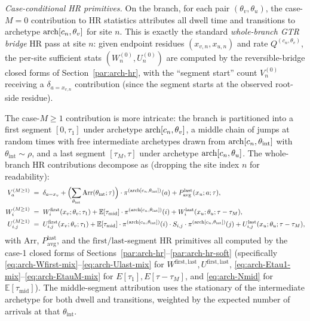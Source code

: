 \emph{Case-conditional HR primitives.} On the branch, for each pair
$(\theta_v, \theta_u)$, the case-$M{=}0$ contribution to HR statistics
attributes all dwell time and transitions to archetype $\mathrm{arch}[c_n,
\theta_v]$ for site $n$. This is exactly the standard \emph{whole-branch
GTR bridge} HR pass at site $n$: given endpoint residues $(x_{v, n},
x_{u, n})$ and rate $Q^{(c_n, \theta_v)}$, the per-site sufficient
stats $(W_n^{(0)}, U_n^{(0)})$ are computed by the reversible-bridge
closed forms of Section~\ref{par:arch-hr}, with the ``segment start''
count $V_n^{(0)}$ receiving a $\delta_{a = x_{v, n}}$ contribution
(since the segment starts at the observed root-side residue).

The case-$M \geq 1$ contribution is more intricate: the branch is
partitioned into a first segment $[0, \tau_1]$ under archetype
$\mathrm{arch}[c_n, \theta_v]$, a middle chain of jumps at random times with
free intermediate archetypes drawn from
$\mathrm{arch}[c_n, \theta_{\mathrm{int}}]$ with $\theta_{\mathrm{int}} \sim
\rho$, and a last segment $[\tau_M, \tau]$ under archetype
$\mathrm{arch}[c_n, \theta_u]$. The whole-branch HR contributions decompose
as (dropping the site index $n$ for readability):
\begin{align}
V^{(M \geq 1)}_a
    &\;=\; \delta_{a = x_v}
    + \Bigl(\sum_{\theta_{\mathrm{int}}} \mathrm{Arr}(\theta_{\mathrm{int}}; \tau)\Bigr)
        \cdot \pi^{(\mathrm{arch}[c_n, \theta_{\mathrm{int}}])}(a)
    + P_{\mathrm{avg}}^{\mathrm{last}}(x_u; a; \tau),
    \label{eq:arch-elbo-Vjump}\\
W^{(M \geq 1)}_i
    &\;=\; W_i^{\mathrm{first}}(x_v; \theta_v; \tau_1)
    + \mathbb{E}[\tau_{\mathrm{mid}}] \cdot \pi^{(\mathrm{arch}[c_n, \theta_{\mathrm{int}}])}(i)
    + W_i^{\mathrm{last}}(x_u; \theta_u; \tau - \tau_M),
    \label{eq:arch-elbo-Wjump}\\
U^{(M \geq 1)}_{i, j}
    &\;=\; U_{i, j}^{\mathrm{first}}(x_v; \theta_v; \tau_1)
    + \mathbb{E}[\tau_{\mathrm{mid}}] \cdot \pi^{(\mathrm{arch}[c_n, \theta_{\mathrm{int}}])}(i)
        \cdot S_{i, j}
        \cdot \pi^{(\mathrm{arch}[c_n, \theta_{\mathrm{int}}])}(j)
    + U_{i, j}^{\mathrm{last}}(x_u; \theta_u; \tau - \tau_M),
    \label{eq:arch-elbo-Ujump}
\end{align}
with $\mathrm{Arr}$, $P_{\mathrm{avg}}^{\mathrm{last}}$, and the
$\mathrm{first}/\mathrm{last}$-segment HR primitives all computed by
the case-1 closed forms of Sections~\ref{par:arch-hr}--\ref{par:arch-hr-soft}
(specifically \eqref{eq:arch-Wfirst-mix}--\eqref{eq:arch-Ulast-mix}
for $W^{\mathrm{first}, \mathrm{last}}, U^{\mathrm{first}, \mathrm{last}}$,
\eqref{eq:arch-Etau1-mix}--\eqref{eq:arch-EtauM-mix} for
$E[\tau_1], E[\tau - \tau_M]$, and \eqref{eq:arch-Nmid} for
$\mathbb{E}[\tau_{\mathrm{mid}}]$). The middle-segment attribution
uses the stationary of the intermediate archetype for both dwell
and transitions, weighted by the expected number of arrivals at that
$\theta_{\mathrm{int}}$.

